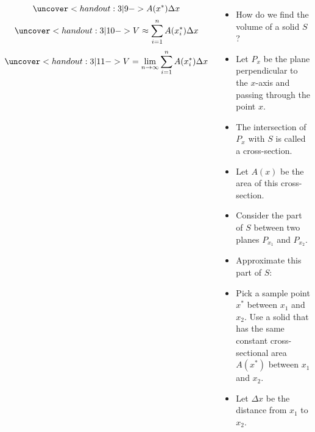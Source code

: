 \begin{frame}
\begin{columns}[c]

\abovedisplayskip=1pt
\belowdisplayskip=1pt
\[
\uncover<handout:3| 9->{A(x^*)\Delta x}%
\]
\abovedisplayskip=1pt
\belowdisplayskip=1pt
\[
\uncover<handout:3| 10->{V \approx \sum_{i=1}^n A(x_i^*)\Delta x}%
\]
\abovedisplayskip=1pt
\belowdisplayskip=1pt
\[
\uncover<handout:3| 11->{V = \lim_{n\to\infty}\sum_{i=1}^n A(x_i^*)\Delta x}%
\]
\begin{itemize}
\item  How do we find the volume of a solid $S$?
\item<handout:2-| 2->  Let $P_x$ be the plane perpendicular to the $x$-axis and passing through the point $x$.
\item<handout:2-| 2->  The intersection of $P_x$ with $S$ is called a cross-section.
\item<handout:2-| 2->  Let $A(x)$ be the area of this cross-section.
\item<handout:3| 6->  Consider the part of $S$ between two planes $P_{x_1}$ and $P_{x_2}$.
\item<handout:3| 7->  Approximate this part of $S$:
\item<handout:3| 7->  Pick a sample point $x^*$ between $x_1$ and $x_2$.  Use a solid that has the same constant cross-sectional area $A(x^*)$ between $x_1$ and $x_2$.
\item<handout:3| 8->  Let $\Delta x$ be the distance from $x_1$ to $x_2$.
\end{itemize}
\end{columns}
\end{frame}
